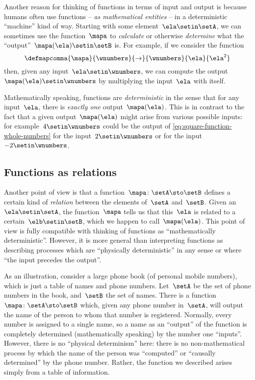 Another reason for thinking of functions in terms of input and output is because humans often use functions -- \emph{as mathematical entities} -- in a deterministic ``machine'' kind of way.
Starting with some element~$\ela \setin\setA$, we can sometimes use the function~$\mapa$ to \emph{calculate} or otherwise \emph{determine} what the ``output''~$\mapa(\ela) \setin\setB$ is.
For example, if we consider the function
%
\begin{equation}
    \label{eq:square-function-whole-numbers}
    \defmapcomma{
        \mapa
    }{
        \wnumbers
    }{
        \to
    }{
        \wnumbers
    }{
        \ela
    }{
        \ela^2
    }
\end{equation}
%
then, given any input~$\ela \setin\wnumbers$, we can compute the output~$\mapa(\ela) \setin\wnumbers$ by multiplying the input~$\ela$ with itself.

Mathematically speaking, functions are \emph{deterministic} in the sense that for any input~$\ela$, there is \emph{exactly one} output~$\mapa(\ela)$.
This is in contrast to the fact that a given output~$\mapa(\ela)$ might arise from various possible inputs: for example~$4 \setin\wnumbers$ could be the output of \cref{eq:square-function-whole-numbers} for the input~$2 \setin\wnumbers$ or for the input~$-2 \setin\wnumbers$.

\subsection{Functions as relations}

Another point of view is that a function~$\mapa\colon \setA \sto \setB$ defines a certain kind of \emph{relation} between the elements of~$\setA$ and~$\setB$.
Given an~$\ela \setin\setA$, the function~$\mapa$ tells us that this~$\ela$ is related to a certain~$\elb \setin \setB$, which we happen to call~$\mapa(\ela)$.
This point of view is fully compatible with thinking of functions as ``mathematically deterministic''.
However, it is more general than interpreting functions as describing processes which are ``physically deterministic'' in any sense or where ``the input precedes the output''.

As an illustration, consider a large phone book (of personal mobile numbers), which is just a table of names and phone numbers.
Let~$\setA$ be the set of phone numbers in the book, and~$\setB$ the set of names.
There is a function~$\mapa\colon \setA \sto \setB$ which, given any phone number in~$\setA$, will output the name of the person to whom that number is registered.
Normally, every number is assigned to a single name, so a name as an ``output'' of the function is completely determined (mathematically speaking) by the number one ``inputs''.
However, there is no ``physical determinism'' here: there is no non-mathematical process by which the name of the person was ``computed'' or ``causally determined'' by the phone number.
Rather, the function we described arises simply from a table of information.

